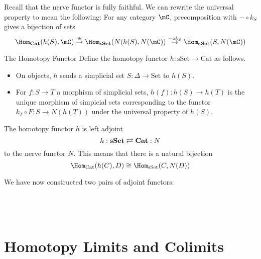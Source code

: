 \documentclass[a4paper]{article}
\begin{document}
Recall that the nerve functor is fully faithful. We can rewrite the universal property to mean the following: For any category $\mC$, precomposition with $-\circ k_S$ gives a bijection of sets $$\Hom_\bold{Cat}(h(S),\mC)\overset{\cong}{\rightarrow}\Hom_\bold{sSet}(N(h(S),N(\mC))\overset{-\circ k_S}{\rightarrow}\Hom_\bold{sSet}(S,N(\mC))$$

\begin{defn}{The Homotopy Functor}{} Define the homotopy functor $h:\text{sSet}\to\text{Cat}$ as follows. 
\begin{itemize}
\item On objects, $h$ sends a simplicial set $S:\Delta\to\text{Set}$ to $h(S)$. 
\item For $f:S\to T$ a morphism of simplicial sets, $h(f):h(S)\to h(T)$ is the unique morphism of simpicial sets corresponding to the functor $k_T\circ F:S\to N(h(T))$ under the universal property of $h(S)$. 
\end{itemize}
\end{defn}

\begin{thm}{}{} The homotopy functor $h$ is left adjoint $$h:\bold{sSet}\rightleftarrows\bold{Cat}:N$$ to the nerve functor $N$. This means that there is a natural bijection $$\Hom_\text{Cat}(h(C),D)\cong\Hom_\text{sSet}(C,N(D))$$
\end{thm}

We have now constructed two pairs of adjoint functors: \\~\\
\\~\\

\pagebreak
\section{Homotopy Limits and Colimits}
\end{document}
